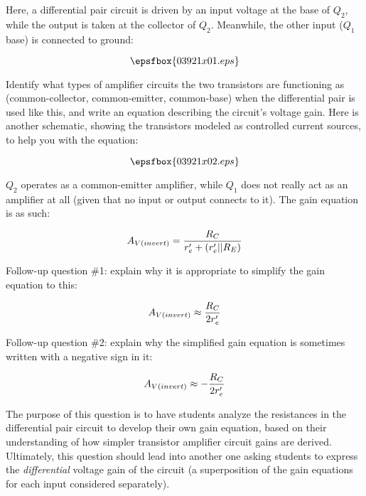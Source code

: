 

Here, a differential pair circuit is driven by an input voltage at the base of $Q_2$, while the output is taken at the collector of $Q_2$.  Meanwhile, the other input ($Q_1$ base) is connected to ground:

$$\epsfbox{03921x01.eps}$$

Identify what types of amplifier circuits the two transistors are functioning as (common-collector, common-emitter, common-base) when the differential pair is used like this, and write an equation describing the circuit's voltage gain.  Here is another schematic, showing the transistors modeled as controlled current sources, to help you with the equation:

$$\epsfbox{03921x02.eps}$$







$Q_2$ operates as a common-emitter amplifier, while $Q_1$ does not really act as an amplifier at all (given that no input or output connects to it).  The gain equation is as such:

$$A_{V(invert)} = {R_C \over {r'_e + (r'_e || R_E)}}$$

\vskip 10pt

Follow-up question \#1: explain why it is appropriate to simplify the gain equation to this:

$$A_{V(invert)} \approx {R_C \over 2r'_e}$$

Follow-up question \#2: explain why the simplified gain equation is sometimes written with a negative sign in it:

$$A_{V(invert)} \approx - {R_C \over 2r'_e}$$







The purpose of this question is to have students analyze the resistances in the differential pair circuit to develop their own gain equation, based on their understanding of how simpler transistor amplifier circuit gains are derived.  Ultimately, this question should lead into another one asking students to express the {\it differential} voltage gain of the circuit (a superposition of the gain equations for each input considered separately).




